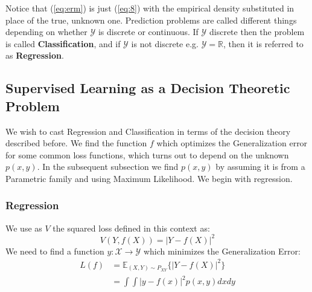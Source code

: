 \documentclass[]{article}
\theoremstyle{mattstyle}
\theoremstyle{definition}
\begin{document}
Notice that (\ref{eq:erm}) is just (\ref{eq:8}) with the empirical density substituted in place of the true, unknown one. Prediction problems are called different things depending on whether $\mathcal{Y}$ is discrete or continuous. If $\mathcal{Y}$ discrete then the problem is called \textbf{Classification}, and if $\mathcal{Y}$ is not discrete e.g. $\mathcal{Y} = \mathbb{R}$, then it is referred to as \textbf{Regression}.  

\subsection{Supervised Learning as a Decision Theoretic Problem}
We wish to cast Regression and Classification in terms of the decision theory described before. We find the function $f$ which optimizes the Generalization error for some common loss functions, which turns out to depend on the unknown $p(x,y)$. In the subsequent subsection we find $p(x,y)$ by assuming it is from a Parametric family and using Maximum Likelihood. We begin with regression.

\subsubsection{Regression}
We use as $V$ the squared loss defined in this context as: $$V(Y, f(X)) = | Y - f(X) |^2$$
We need to find a function $y: \mathcal{X} \rightarrow \mathcal{Y}$ which minimizes the Generalization Error:
\begin{align*}
L(f) &= \mathbb{E}_{(X,Y)\sim P_{XY}}\{| Y - f(X) |^2\}\\
&= \int \int | y - f(x) |^2 p(x, y) dx dy
\end{align*}
\end{document}
